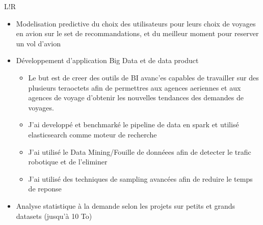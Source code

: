 \documentclass[6pt]{article}
\newcommand\VRule{\color{lightgray}\vrule width 0.5pt}
\begin{document}
\begin{tabular}{L!{\VRule}R}
\begin{itemize}
	\item Modelisation predictive du choix des utilisateurs pour leurs choix de voyages en avion sur le set de recommandations, et du meilleur moment pour reserver un vol d'avion
	\item D\'{e}veloppement d'application Big Data et de data product
		\begin{itemize}
		\item Le but est de creer des outils de BI avanc'es capables de travailler sur des plusieurs teraoctets afin de permettres aux agences aeriennes et aux agences de voyage d'obtenir les nouvelles tendances des demandes de voyages.
		\item J'ai developp\'{e} et benchmark\'{e} le pipeline de data en spark et utilis\'{e} elasticsearch comme moteur de recherche
		\item J'ai utilis\'{e} le Data Mining/Fouille de donn\'{e}ees afin de detecter le trafic robotique et de l'eliminer
		\item J'ai utilis\'{e} des techniques de sampling avanc\'{e}es afin de reduire le temps de reponse
		\end{itemize}
	\item Analyse statistique \`{a} la demande selon les projets sur petits et grands datasets (jusqu'\`{a} 10 To)
\end{itemize}


\end{tabular}
\end{document}
